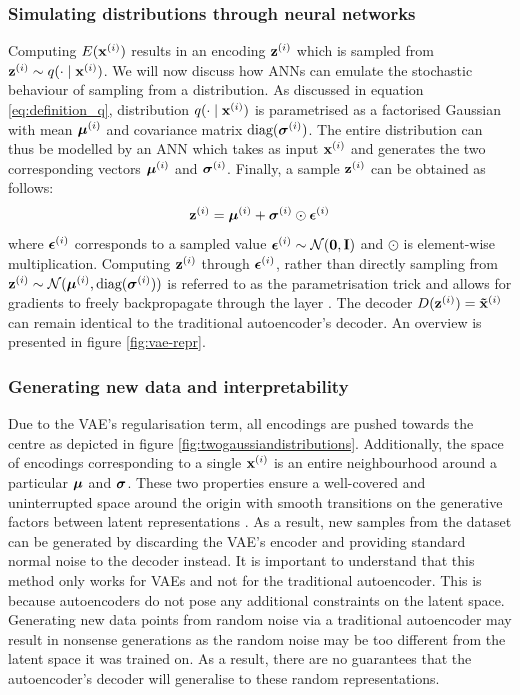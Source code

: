\subsubsection{Simulating distributions through neural networks}
	Computing $E(\mathbf{x}^{(i)})$ results in an encoding $\mathbf{z}^{(i)}$ which is sampled from $\mathbf{z}^{(i)} \sim q ( \cdot \mid \mathbf{x}^{(i)})$. We will now discuss how ANNs can emulate the stochastic behaviour of sampling from a distribution. As discussed in equation \ref{eq:definition_q}, distribution $q ( \cdot \mid \mathbf{x}^{(i)})$ is parametrised as a factorised Gaussian with mean $\bm{\mu}^{(i)}$ and covariance matrix $\text{diag}(\bm{\sigma}^{(i)})$. The entire distribution can thus be modelled by an ANN which takes as input $\mathbf{x}^{(i)}$ and generates the two corresponding vectors $\bm{\mu}^{(i)}$ and $\bm{\sigma}^{(i)}$. Finally, a sample $\mathbf{z}^{(i)}$ can be obtained as follows:
	\begin{equation}
		\mathbf{z}^{(i)} = \bm{\mu}^{(i)} + \bm{\sigma}^{(i)} \odot \bm{\epsilon}^{(i)}
	\end{equation}
	where $\bm{\epsilon}^{(i)}$ corresponds to a sampled value $\bm{\epsilon}^{(i)} \sim \mathcal{N}(\bm{\mathbf{0}}, \mathbf{I})$ and $\odot$ is element-wise multiplication. Computing $\mathbf{z}^{(i)}$ through $\bm{\epsilon}^{(i)}$, rather than directly sampling from $\mathbf{z}^{(i)} \sim \mathcal{N}(\bm{\mu}^{(i)}, \text{diag}(\bm{\sigma}^{(i)}))$ is referred to as the parametrisation trick and allows for gradients to freely backpropagate through the layer \citep{davidfosterVariationalAutoencoders2023}. The decoder $D(\mathbf{z}^{(i)}) = \mathbf{\tilde{x}}^{(i)}$ can remain identical to the traditional autoencoder's decoder. An overview is presented in figure \ref{fig:vae-repr}.
	
	
	
	
	
	




	
	


\subsubsection{Generating new data and interpretability}	
	Due to the VAE's regularisation term, all encodings are pushed towards the centre as depicted in figure \ref{fig:twogaussiandistributions}. Additionally, the space of encodings corresponding to a single $\mathbf{x}^{(i)}$ is an entire neighbourhood around a particular $\bm{\mu}$ and $\bm{\sigma}$. These two properties ensure a well-covered and uninterrupted space around the origin with smooth transitions on the generative factors between latent representations \citep{davidfosterVariationalAutoencoders2023}. As a result, new samples from the dataset can be generated by discarding the VAE's encoder and providing standard normal noise to the decoder instead. It is important to understand that this method only works for VAEs and not for the traditional autoencoder. This is because autoencoders do not pose any additional constraints on the latent space. Generating new data points from random noise via a traditional autoencoder may result in nonsense generations as the random noise may be too different from the latent space it was trained on. As a result, there are no guarantees that the autoencoder's decoder will generalise to these random representations.
	
